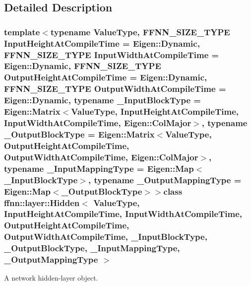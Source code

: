 \subsection{Detailed Description}
\subsubsection*{template$<$typename Value\-Type, F\-F\-N\-N\-\_\-\-S\-I\-Z\-E\-\_\-\-T\-Y\-P\-E Input\-Height\-At\-Compile\-Time = Eigen\-::\-Dynamic, F\-F\-N\-N\-\_\-\-S\-I\-Z\-E\-\_\-\-T\-Y\-P\-E Input\-Width\-At\-Compile\-Time = Eigen\-::\-Dynamic, F\-F\-N\-N\-\_\-\-S\-I\-Z\-E\-\_\-\-T\-Y\-P\-E Output\-Height\-At\-Compile\-Time = Eigen\-::\-Dynamic, F\-F\-N\-N\-\_\-\-S\-I\-Z\-E\-\_\-\-T\-Y\-P\-E Output\-Width\-At\-Compile\-Time = Eigen\-::\-Dynamic, typename \-\_\-\-Input\-Block\-Type = Eigen\-::\-Matrix$<$\-Value\-Type, Input\-Height\-At\-Compile\-Time, Input\-Width\-At\-Compile\-Time, Eigen\-::\-Col\-Major$>$, typename \-\_\-\-Output\-Block\-Type = Eigen\-::\-Matrix$<$\-Value\-Type, Output\-Height\-At\-Compile\-Time, Output\-Width\-At\-Compile\-Time, Eigen\-::\-Col\-Major$>$, typename \-\_\-\-Input\-Mapping\-Type = Eigen\-::\-Map$<$\-\_\-\-Input\-Block\-Type$>$, typename \-\_\-\-Output\-Mapping\-Type = Eigen\-::\-Map$<$\-\_\-\-Output\-Block\-Type$>$$>$class ffnn\-::layer\-::\-Hidden$<$ Value\-Type, Input\-Height\-At\-Compile\-Time, Input\-Width\-At\-Compile\-Time, Output\-Height\-At\-Compile\-Time, Output\-Width\-At\-Compile\-Time, \-\_\-\-Input\-Block\-Type, \-\_\-\-Output\-Block\-Type, \-\_\-\-Input\-Mapping\-Type, \-\_\-\-Output\-Mapping\-Type $>$}

A network hidden-\/layer object. 

